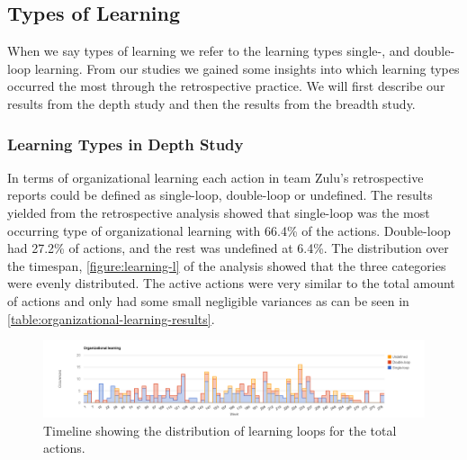 \subsection{Types of Learning}
When we say types of learning we refer to the learning types single-, and double-loop learning. From our studies we gained some insights into which learning types occurred the most through the retrospective practice. We will first describe our results from the depth study and then the results from the breadth study. 

\subsubsection{Learning Types in Depth Study}
In terms of organizational learning each action in team Zulu's retrospective reports could be defined as single-loop, double-loop or undefined. The results yielded from the retrospective analysis showed that single-loop was the most occurring type of organizational learning with 66.4\% of the actions. Double-loop had 27.2\% of actions, and the rest was undefined at 6.4\%. The distribution over the timespan, \autoref{figure:learning-l} of the analysis showed that the three categories were evenly distributed. The active actions were very similar to the total amount of actions and only had some small negligible variances as can be seen in \autoref{table:organizational-learning-results}.

\begin{table}[!h]
	\begin{center}
	\caption{Results from the content analysis regarding the organizational learning nature of the action.}
	\label{table:organizational-learning-results}
	\end{center}
\end{table}

\begin{figure}
	\centering
	\includegraphics[width=\textwidth, keepaspectratio]{figures/learning-l.png}
	\caption{Timeline showing the distribution of learning loops for the total actions.}
	\label{figure:learning-l}
\end{figure}
\afterpage{\clearpage}

